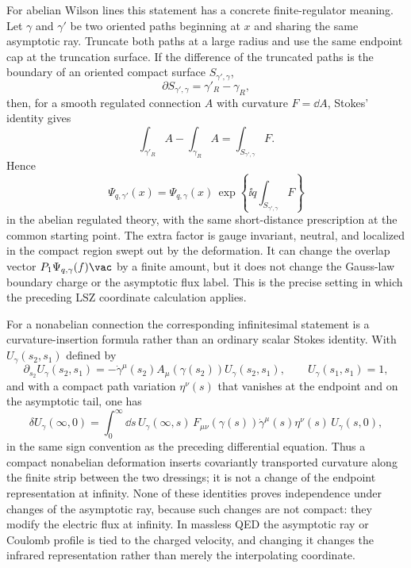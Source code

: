 For abelian Wilson lines this statement has a concrete finite-regulator
meaning.  Let \(\gamma\) and \(\gamma'\) be two oriented paths beginning at
\(x\) and sharing the same asymptotic ray.  Truncate both paths at a large
radius and use the same endpoint cap at the truncation surface.  If the
difference of the truncated paths is the boundary of an oriented compact
surface \(S_{\gamma',\gamma}\),
\[
  \partial S_{\gamma',\gamma}
  =
  \gamma'_R-\gamma_R ,
\]
then, for a smooth regulated connection \(A\) with curvature \(F=\dd A\),
Stokes' identity gives
\begin{equation}
  \int_{\gamma'_R} A-\int_{\gamma_R}A
  =
  \int_{S_{\gamma',\gamma}} F .
  \label{eq:compact-dressing-stokes}
\end{equation}
Hence
\[
  \Psi_{q,\gamma'}(x)
  =
  \Psi_{q,\gamma}(x)\,
  \exp\left\{\ii q\int_{S_{\gamma',\gamma}}F\right\}
\]
in the abelian regulated theory, with the same short-distance prescription at
the common starting point.  The extra factor is gauge invariant, neutral, and
localized in the compact region swept out by the deformation.  It can change
the overlap vector \(P_1\Psi_{q,\gamma}(f)\vac\) by a finite amount, but it
does not change the Gauss-law boundary charge or the asymptotic flux label.
This is the precise setting in which the preceding LSZ coordinate calculation
applies.

For a nonabelian connection the corresponding infinitesimal statement is a
curvature-insertion formula rather than an ordinary scalar Stokes identity.
With \(U_\gamma(s_2,s_1)\) defined by
\[
  \partial_{s_2}U_\gamma(s_2,s_1)
  =
  -\dot\gamma^\mu(s_2)A_\mu(\gamma(s_2))U_\gamma(s_2,s_1),
  \qquad U_\gamma(s_1,s_1)=1,
\]
and with a compact path variation \(\eta^\nu(s)\) that vanishes at the
endpoint and on the asymptotic tail, one has
\[
  \delta U_\gamma(\infty,0)
  =
  \int_0^\infty\dd s\,
  U_\gamma(\infty,s)\,
  F_{\mu\nu}(\gamma(s))\dot\gamma^\mu(s)\eta^\nu(s)\,
  U_\gamma(s,0),
\]
in the same sign convention as the preceding differential equation.  Thus a
compact nonabelian deformation inserts covariantly transported curvature along
the finite strip between the two dressings; it is not a change of the endpoint
representation at infinity.  None of these identities proves independence
under changes of the asymptotic ray, because such changes are not compact:
they modify the electric flux at infinity.  In massless QED the asymptotic
ray or Coulomb profile is tied to the charged velocity, and changing it
changes the infrared representation rather than merely the interpolating
coordinate.

